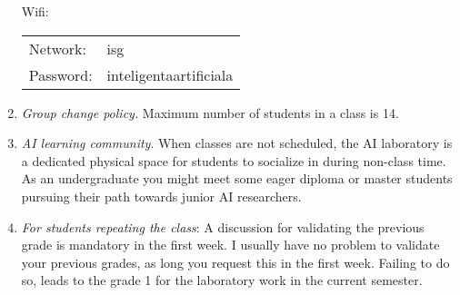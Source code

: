 \begin{enumerate}
\begin{center}
Wifi:
\begin{tabular}{ll}
Network: &isg\\
Password: &inteligentaartificiala\\
\end{tabular}
\end{center}

\item {\it Group change policy.} Maximum number of students in a class is 14.

\item {\it AI learning community}. When classes are not scheduled, the AI laboratory is a dedicated physical space for students to socialize in during non-class time. As an undergraduate you might meet some eager diploma or master students pursuing their path towards junior AI researchers.

\item {\it For students repeating the class}: A discussion for validating the previous grade is mandatory in the first week. I usually have no problem to validate your previous grades, as long you request this in the first week. 
Failing to do so, leads to the grade 1 for the laboratory work in the current semester.


\end{enumerate}




